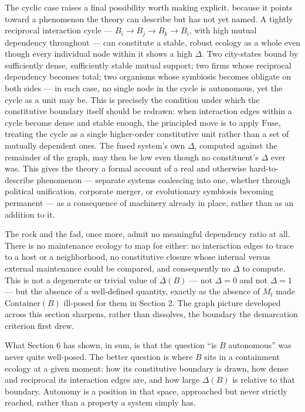 \documentclass[11pt]{article}
\theoremstyle{plain}
\begin{document}
The cyclic case raises a final possibility worth making explicit, because it points toward a phenomenon the theory can describe but has not yet named. A tightly reciprocal interaction cycle --- \(B_i \to B_j \to B_k \to B_i\), with high mutual dependency throughout --- can constitute a stable, robust ecology as a whole even though every individual node within it shows a high \(\Delta\). Two city-states bound by sufficiently dense, sufficiently stable mutual support; two firms whose reciprocal dependency becomes total; two organisms whose symbiosis becomes obligate on both sides --- in each case, no single node in the cycle is autonomous, yet the cycle as a unit may be. This is precisely the condition under which the constitutive boundary itself should be redrawn: when interaction edges within a cycle become dense and stable enough, the principled move is to apply \(\mathrm{Fuse}\), treating the cycle as a single higher-order constitutive unit rather than a set of mutually dependent ones. The fused system's own \(\Delta\), computed against the remainder of the graph, may then be low even though no constituent's \(\Delta\) ever was. This gives the theory a formal account of a real and otherwise hard-to-describe phenomenon --- separate systems coalescing into one, whether through political unification, corporate merger, or evolutionary symbiosis becoming permanent --- as a consequence of machinery already in place, rather than as an addition to it.

The rock and the fad, once more, admit no meaningful dependency ratio at all. There is no maintenance ecology to map for either: no interaction edges to trace to a host or a neighborhood, no constitutive closure whose internal versus external maintenance could be compared, and consequently no \(\Delta\) to compute. This is not a degenerate or trivial value of \(\Delta(B)\) --- not \(\Delta = 0\) and not \(\Delta = 1\) --- but the absence of a well-defined quantity, exactly as the absence of \(M_t\) made \(\mathrm{Container}(B)\) ill-posed for them in Section 2. The graph picture developed across this section sharpens, rather than dissolves, the boundary the demarcation criterion first drew.

What Section 6 has shown, in sum, is that the question ``is \(B\) autonomous'' was never quite well-posed. The better question is where \(B\) sits in a containment ecology at a given moment: how its constitutive boundary is drawn, how dense and reciprocal its interaction edges are, and how large \(\Delta(B)\) is relative to that boundary. Autonomy is a position in that space, approached but never strictly reached, rather than a property a system simply has.
\end{document}
